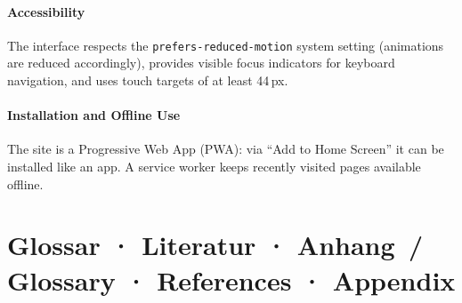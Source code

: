 \documentclass[11pt,a4paper,twoside]{article}
\begin{document}
\subsection{Accessibility}
The interface respects the \texttt{prefers-reduced-motion} system setting (animations are reduced accordingly), provides visible focus indicators for keyboard navigation, and uses touch targets of at least 44\,px.

\subsection{Installation and Offline Use}
The site is a Progressive Web App (PWA): via ``Add to Home Screen'' it can be installed like an app. A service worker keeps recently visited pages available offline.

\clearpage
\part{Glossar · Literatur · Anhang \,/\, Glossary · References · Appendix}
\setcounter{section}{0}
\end{document}
